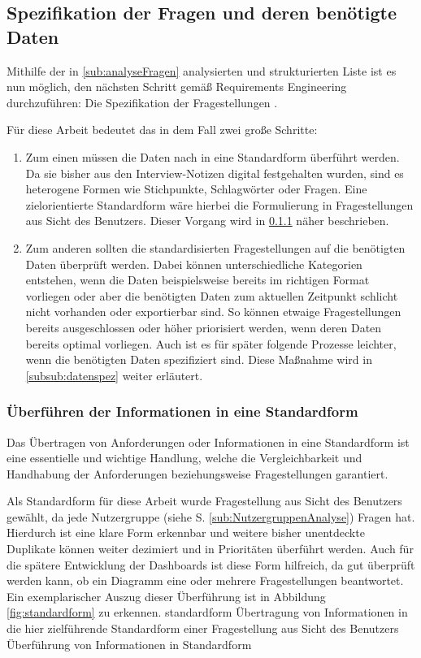 \subsection{Spezifikation der Fragen und deren benötigte Daten}
\label{sub:spezifikation}
Mithilfe der in \ref{sub:analyseFragen} analysierten und strukturierten Liste ist es nun möglich, den nächsten Schritt gemäß Requirements Engineering durchzuführen: Die Spezifikation der Fragestellungen \cite{Pohl.2011}.

Für diese Arbeit bedeutet das in dem Fall zwei große Schritte: 
\begin{enumerate}
\item Zum einen müssen die Daten nach \cite{Patig.} in eine Standardform überführt werden. 
Da sie bisher aus den Interview-Notizen digital festgehalten wurden, sind es heterogene Formen wie Stichpunkte, Schlagwörter oder Fragen.
Eine zielorientierte Standardform wäre hierbei die Formulierung in Fragestellungen aus Sicht des Benutzers.
Dieser Vorgang wird in \ref{subsub:standardform} näher beschrieben.
\item Zum anderen sollten die standardisierten Fragestellungen auf die benötigten Daten überprüft werden.
Dabei können unterschiedliche Kategorien entstehen, wenn die Daten beispielsweise bereits im richtigen Format vorliegen oder aber die benötigten Daten zum aktuellen Zeitpunkt schlicht nicht vorhanden oder exportierbar sind.
So können etwaige Fragestellungen bereits ausgeschlossen oder höher priorisiert werden, wenn deren Daten bereits optimal vorliegen.
Auch ist es für später folgende Prozesse leichter, wenn die benötigten Daten spezifiziert sind.
Diese Maßnahme wird in \ref{subsub:datenspez} weiter erläutert.
\end{enumerate}

\subsubsection{Überführen der Informationen in eine Standardform}
\label{subsub:standardform}
Das Übertragen von Anforderungen oder Informationen in eine Standardform ist eine essentielle und wichtige Handlung, welche die Vergleichbarkeit und Handhabung der Anforderungen beziehungsweise Fragestellungen garantiert.

Als Standardform für diese Arbeit wurde \glqq Fragestellung aus Sicht des Benutzers\grqq{} gewählt, da jede Nutzergruppe (siehe S.\pageref{sub:NutzergruppenAnalyse} \ref{sub:NutzergruppenAnalyse}) Fragen hat.
Hierdurch ist eine klare Form erkennbar und weitere bisher unentdeckte Duplikate können weiter dezimiert und in Prioritäten überführt werden.
Auch für die spätere Entwicklung der Dashboards ist diese Form hilfreich, da gut überprüft werden kann, ob ein Diagramm eine oder mehrere Fragestellungen beantwortet.
Ein exemplarischer Auszug dieser Überführung ist in Abbildung \ref{fig:standardform} zu erkennen.
\bildbreit
{standardform}
{Übertragung von Informationen in die hier zielführende Standardform einer Fragestellung aus Sicht des Benutzers}
{Überführung von Informationen in Standardform}

